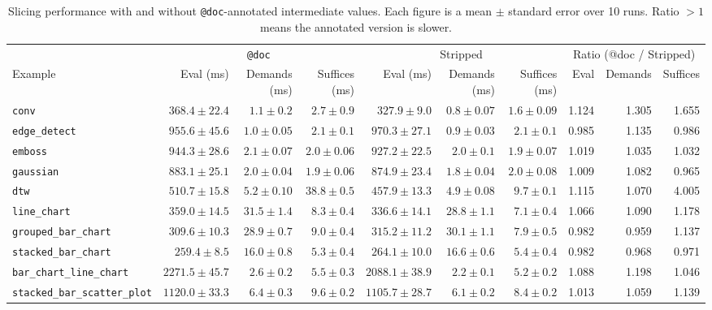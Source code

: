 \begin{table}[htbp]
\centering
\small
\begin{tabular}{l r r r r r r r r r}
\toprule
 & \multicolumn{3}{c}{\texttt{@doc}} & \multicolumn{3}{c}{Stripped} & \multicolumn{3}{c}{Ratio (@doc / Stripped)} \\
\cmidrule(lr){2-4} \cmidrule(lr){5-7} \cmidrule(lr){8-10}
Example & {Eval (ms)} & {Demands (ms)} & {Suffices (ms)} & {Eval (ms)} & {Demands (ms)} & {Suffices (ms)} & {Eval} & {Demands} & {Suffices} \\
\midrule
\texttt{conv} & $368.4 \pm 22.4$ & $1.1 \pm 0.2$ & $2.7 \pm 0.9$ & $327.9 \pm 9.0$ & $0.8 \pm 0.07$ & $1.6 \pm 0.09$ & 1.124 & 1.305 & 1.655 \\
\texttt{edge\_detect} & $955.6 \pm 45.6$ & $1.0 \pm 0.05$ & $2.1 \pm 0.1$ & $970.3 \pm 27.1$ & $0.9 \pm 0.03$ & $2.1 \pm 0.1$ & 0.985 & 1.135 & 0.986 \\
\texttt{emboss} & $944.3 \pm 28.6$ & $2.1 \pm 0.07$ & $2.0 \pm 0.06$ & $927.2 \pm 22.5$ & $2.0 \pm 0.1$ & $1.9 \pm 0.07$ & 1.019 & 1.035 & 1.032 \\
\texttt{gaussian} & $883.1 \pm 25.1$ & $2.0 \pm 0.04$ & $1.9 \pm 0.06$ & $874.9 \pm 23.4$ & $1.8 \pm 0.04$ & $2.0 \pm 0.08$ & 1.009 & 1.082 & 0.965 \\
\texttt{dtw} & $510.7 \pm 15.8$ & $5.2 \pm 0.10$ & $38.8 \pm 0.5$ & $457.9 \pm 13.3$ & $4.9 \pm 0.08$ & $9.7 \pm 0.1$ & 1.115 & 1.070 & 4.005 \\
\texttt{line\_chart} & $359.0 \pm 14.5$ & $31.5 \pm 1.4$ & $8.3 \pm 0.4$ & $336.6 \pm 14.1$ & $28.8 \pm 1.1$ & $7.1 \pm 0.4$ & 1.066 & 1.090 & 1.178 \\
\texttt{grouped\_bar\_chart} & $309.6 \pm 10.3$ & $28.9 \pm 0.7$ & $9.0 \pm 0.4$ & $315.2 \pm 11.2$ & $30.1 \pm 1.1$ & $7.9 \pm 0.5$ & 0.982 & 0.959 & 1.137 \\
\texttt{stacked\_bar\_chart} & $259.4 \pm 8.5$ & $16.0 \pm 0.8$ & $5.3 \pm 0.4$ & $264.1 \pm 10.0$ & $16.6 \pm 0.6$ & $5.4 \pm 0.4$ & 0.982 & 0.968 & 0.971 \\
\texttt{bar\_chart\_line\_chart} & $2271.5 \pm 45.7$ & $2.6 \pm 0.2$ & $5.5 \pm 0.3$ & $2088.1 \pm 38.9$ & $2.2 \pm 0.1$ & $5.2 \pm 0.2$ & 1.088 & 1.198 & 1.046 \\
\texttt{stacked\_bar\_scatter\_plot} & $1120.0 \pm 33.3$ & $6.4 \pm 0.3$ & $9.6 \pm 0.2$ & $1105.7 \pm 28.7$ & $6.1 \pm 0.2$ & $8.4 \pm 0.2$ & 1.013 & 1.059 & 1.139 \\
\bottomrule
\end{tabular}
\caption{Slicing performance with and without \texttt{@doc}-annotated intermediate values. Each figure is a mean $\pm$ standard error over 10 runs. Ratio $> 1$ means the annotated version is slower.}
\label{tab:doc-summary}
\end{table}
